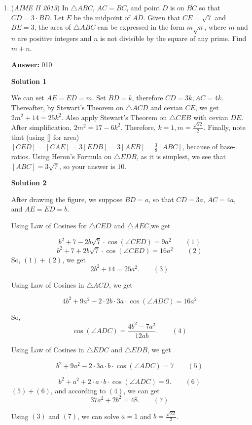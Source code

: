 \begin{enumerate}
 


	\item (\textit{AIME II 2013}) In $\triangle ABC$, $AC = BC$, and point $D$ is on $\overline{BC}$ so that $CD = 3\cdot BD$. Let $E$ be the midpoint of $\overline{AD}$. Given that $CE = \sqrt{7}$ and $BE = 3$, the area of $\triangle ABC$ can be expressed in the form $m\sqrt{n}$, where $m$ and $n$ are positive integers and $n$ is not divisible by the square of any prime. Find $m+n$.


 
 \textbf{Answer: }010



\textbf{Solution 1}

We can set $AE=ED=m$. Set $BD=k$, therefore $CD=3k, AC=4k$. Thereafter, by Stewart's Theorem on $\triangle ACD$ and cevian $CE$, we get $2m^2+14=25k^2$. Also apply Stewart's Theorem on $\triangle CEB$ with cevian $DE$. After simplification, $2m^2=17-6k^2$. Therefore, $k=1, m=\frac{\sqrt{22}}{2}$. Finally, note that (using [] for area) $[CED]=[CAE]=3[EDB]=3[AEB]=\frac{3}{8}[ABC]$, because of base-ratios. Using Heron's Formula on $\triangle EDB$, as it is simplest, we see that $[ABC]=3\sqrt{7}$, so your answer is $10$.

 



\textbf{Solution 2}

After drawing the figure, we suppose $BD=a$, so that $CD=3a$, $AC=4a$, and $AE=ED=b$.

 Using Law of Cosines for $\triangle CED$ and $\triangle AEC$,we get

 
 \[b^2+7-2b\sqrt{7}\cdot \cos(\angle CED)=9a^2\qquad (1)\]
 \[b^2+7+2b\sqrt{7}\cdot \cos(\angle CED)=16a^2\qquad (2)\]So, $(1)+(2)$, we get
 \[2b^2+14=25a^2. \qquad (3)\]

 Using Law of Cosines in $\triangle ACD$, we get

 
 \[4b^2+9a^2-2\cdot 2b\cdot 3a\cdot \cos(\angle ADC)=16a^2\]

 So, 
 \[\cos(\angle ADC)=\frac{4b^2-7a^2}{12ab}.\qquad (4)\]

 Using Law of Cosines in $\triangle EDC$ and $\triangle EDB$, we get

 
 \[b^2+9a^2-2\cdot 3a\cdot b\cdot \cos(\angle ADC)=7\qquad (5)\]

 \[b^2+a^2+2\cdot a\cdot b\cdot \cos(\angle ADC)=9.\qquad (6)\]
$(5)+(6)$, and according to $(4)$, we can get 
 \[37a^2+2b^2=48. \qquad (7)\]

 Using $(3)$ and $(7)$, we can solve $a=1$ and $b=\frac{\sqrt{22}}{2}$.


\end{enumerate}
